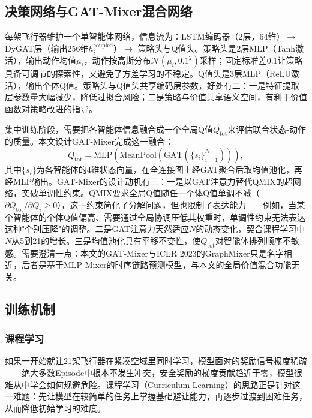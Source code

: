 \documentclass[12pt,a4paper,UTF8]{ctexart}
\begin{document}
\subsection{决策网络与GAT-Mixer混合网络}

每架飞行器维护一个单智能体网络，信息流为：LSTM编码器（2层，64维）$\to$ DyGAT层（输出256维$h_i^{\text{coupled}}$）$\to$ 策略头与Q值头。策略头是2层MLP（Tanh激活），输出动作均值$\mu_i$，动作按高斯分布$\mathcal{N}(\mu_i, 0.1^2)$采样；固定标准差0.1让策略具备可调节的探索性，又避免了方差学习的不稳定。Q值头是3层MLP（ReLU激活），输出个体Q值。策略头与Q值头共享编码层参数，好处有二：一是特征提取层参数量大幅减少，降低过拟合风险；二是策略与价值共享语义空间，有利于价值函数对策略改进的指导。

集中训练阶段，需要把各智能体信息融合成一个全局Q值$Q_{\text{tot}}$来评估联合状态-动作的质量。本文设计GAT-Mixer完成这一融合：
\begin{equation}
    Q_{\text{tot}} = \text{MLP}\!\left(\text{MeanPool}\!\left(\text{GAT}\left(\{s_i\}_{i=1}^{N}\right)\right)\right),
    \label{eq:gat_mixer}
\end{equation}
其中$\{s_i\}$为各智能体的4维状态向量，在全连接图上经GAT聚合后取均值池化，再经MLP输出。GAT-Mixer的设计动机有三：一是以GAT注意力替代QMIX的超网络，突破单调性约束。QMIX要求全局Q值随任一个体Q值单调不减（$\partial Q_{\text{tot}}/\partial Q_i\geq0$），这一约束简化了分解问题，但也限制了表达能力——例如，当某个智能体的个体Q值偏高、需要通过全局协调压低其权重时，单调性约束无法表达这种"个别压降"的调整。二是GAT注意力天然适应$N$的动态变化，契合课程学习中$N$从5到21的增长。三是均值池化具有平移不变性，使$Q_{\text{tot}}$对智能体排列顺序不敏感。需要澄清一点：本文的GAT-Mixer与ICLR 2023的GraphMixer\cite{ref28}只是名字相近，后者是基于MLP-Mixer的时序链路预测模型，与本文的全局价值混合功能无关。

\subsection{训练机制}

\subsubsection{课程学习}

如果一开始就让21架飞行器在紧凑空域里同时学习，模型面对的奖励信号极度稀疏——绝大多数Episode中根本不发生冲突，安全奖励的梯度贡献趋近于零，模型很难从中学会如何规避危险。课程学习（Curriculum Learning）\cite{ref39}的思路正是针对这一难题：先让模型在较简单的任务上掌握基础避让能力，再逐步过渡到困难任务，从而降低初始学习的难度。
\end{document}
